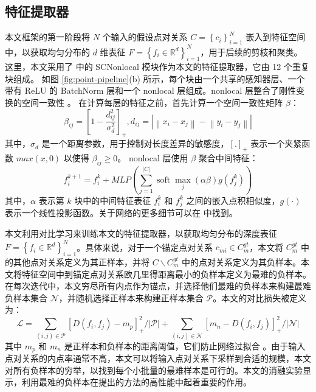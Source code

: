 \subsection{特征提取器}\label{sec:feature_extr}
本文框架的第一阶段将 $N$ 个输入的假设点对关系 $C=\left\{c_{i}\right\}_{i=1}^{N}$ 嵌入到特征空间中，以获取均匀分布的 $d$ 维表征 $F=\left\{f_{i} \in \mathbb{R}^{d}\right\}_{i=1}^{N}$，用于后续的剪枝和聚类。
这里，本文采用了 \cite{bai2021pointdsc} 中的 SCNonlocal 模块作为本文的特征提取器，它由 12 个重复块组成。
如图 \ref{fig:point-pipeline}(b) 所示，每个块由一个共享的感知器层、一个带有 ReLU 的 BatchNorm 层和一个 nonlocal 层组成。nonlocal 层整合了刚性变换的空间一致性 \cite{leordeanu2005spectral} 。
在计算每层的特征之前，首先计算一个空间一致性矩阵 $\beta$：
\begin{equation}
  \beta_{i j}=\left[1-\frac{d_{i j}^{2}}{\sigma_{d}^{2}}\right]_{+}, d_{i j}=\left|\left\|x_{i}-x_{j}\right\|-\left\|y_{i}-y_{j}\right\|\right|
\end{equation}
其中，$\sigma_{d}$ 是一个距离参数，用于控制对长度差异的敏感度，$[.]_+$ 表示一个夹紧函数 $max(x,0)$ 以使得 $\beta_{ij} \geq 0$。
nonlocal 层使用 $\beta$ 聚合中间特征：
\begin{equation}
  f_{i}^{k+1}=f_{i}^{k}+M L P\left(\sum_{j=1}^{|C|} \operatorname{soft} \max _{j}(\alpha \beta) g\left(f_{j}^{k}\right)\right)
\end{equation}
其中，$\alpha$ 表示第 $k$ 块中的中间特征表征 $f_i^k$ 和 $f_j^k$ 之间的嵌入点积相似度，$g(\cdot)$ 表示一个线性投影函数。关于网络的更多细节可以在 \cite{bai2021pointdsc} 中找到。

本文利用对比学习来训练本文的特征提取器，以获取均匀分布的深度表征 $F=\left\{f_{i} \in \mathbb{R}^{d}\right\}_{i=1}^{N}$。具体来说，对于一个锚定点对关系 $c_{m i} \in C_{m}^{g t}$，本文将 $C_m^{gt}$ 中的其他点对关系定义为其正样本，并将 $C \backslash C_{m}^{g t}$ 中的点对关系定义为其负样本。本文将特征空间中到锚定点对关系欧几里得距离最小的负样本定义为最难的负样本。在每次迭代中，本文穷尽所有内点作为锚点，并选择他们最难的负样本来构建最难负样本集合 $\mathcal{N}$，并随机选择正样本来构建正样本集合 $\mathcal{P}$。本文的对比损失被定义为：
\begin{equation}
  \mathcal{L}=\sum_{(i, j) \in \mathcal{P}}\left[D\left(f_{i}, f_{j}\right)-m_{p}\right]_{+}^{2} /|\mathcal{P}|+\sum_{(i, j) \in \mathcal{N}}\left[m_{n}-D\left(f_{i}, f_{j}\right)\right]_{+}^{2} /|\mathcal{N}|
  \label{loss}
\end{equation}
其中 $m_p$ 和 $m_n$ 是正样本和负样本的距离阈值，它们防止网络过拟合 \cite{lin2015Deephash}。由于输入点对关系的内点率通常不高，本文可以将输入点对关系下采样到合适的规模，本文对所有负样本的穷举，以找到每个小批量的最难样本是可行的。本文的消融实验显示，利用最难的负样本在提出的方法的高性能中起着重要的作用。

